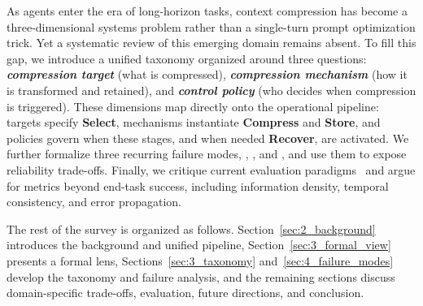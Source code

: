 As agents enter the era of long-horizon tasks, context compression has become a three-dimensional systems problem rather than a single-turn prompt optimization trick. Yet a systematic review of this emerging domain remains absent. To fill this gap, we introduce a unified taxonomy organized around three questions: \textbf{\textit{compression target}} (what is compressed), \textbf{\textit{compression mechanism}} (how it is transformed and retained), and \textbf{\textit{control policy}} (who decides when compression is triggered). These dimensions map directly onto the operational pipeline: targets specify \textbf{Select}, mechanisms instantiate \textbf{Compress} and \textbf{Store}, and policies govern when these stages, and when needed \textbf{Recover}, are activated. We further formalize three recurring failure modes, \fone, \ftwo, and \fthree, and use them to expose reliability trade-offs. Finally, we critique current evaluation paradigms~\citep{liu2025agentbenchevaluatingllmsagents} and argue for metrics beyond end-task success, including information density, temporal consistency, and error propagation.

The rest of the survey is organized as follows. Section~\ref{sec:2_background} introduces the background and unified pipeline, Section~\ref{sec:3_formal_view} presents a formal lens, Sections~\ref{sec:3_taxonomy} and~\ref{sec:4_failure_modes} develop the taxonomy and failure analysis, and the remaining sections discuss domain-specific trade-offs, evaluation, future directions, and conclusion.
